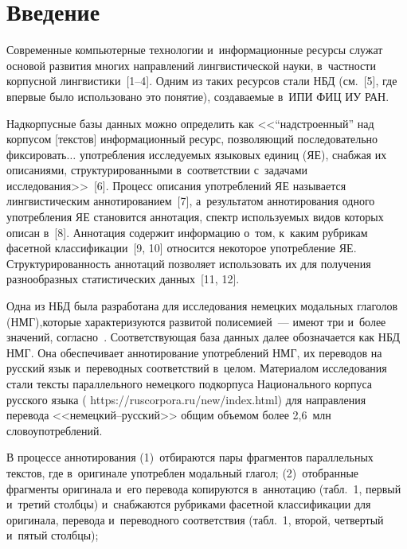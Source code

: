       
  
\vspace*{-3pt}


\thispagestyle{headings}

\begin{multicols}{2}

\label{st\stat}
      
\section{Введение}

     Современные компьютерные технологии и~информационные ресурсы 
служат основой развития многих направлений лингвистической науки, 
в~частности корпусной лингвистики~[1--4]. Одним из таких ресурсов стали 
НБД (см.~[5], где впервые было использовано это 
понятие), создаваемые в~ИПИ ФИЦ ИУ РАН.
     
Надкорпусные базы данных можно определить как <<``надстроенный'' над корпусом [текстов] 
информационный ресурс, позволяющий последовательно фиксировать$\ldots$ 
употребления исследуемых языковых единиц (ЯЕ), снабжая их описаниями, 
структурированными в~соответствии с~задачами исследования>>~[6]. Процесс 
описания употреблений ЯЕ называется лингвистическим аннотиро\-ванием~[7], 
а~результатом аннотирования одного употребления ЯЕ становится аннотация, 
спектр исполь\-зуемых видов которых описан в~[8]. Анно\-тация содержит 
информацию о~том, к~каким руб\-ри\-кам фасетной классификации~[9, 10] 
относится некоторое употребление ЯЕ. Структурированность аннотаций 
позволяет использовать их для получения разнообразных статистических 
данных~[11, 12].
     
     Одна из НБД была разработана для исследо\-вания немецких модальных 
глаголов (НМГ),\linebreak которые характеризуются развитой полисемией~--- имеют три 
и~более значений, согласно~\cite{13-gon}. Соответствующая база данных далее 
обозначается как НБД НМГ. Она обеспечивает аннотирование употреблений 
НМГ, их переводов на русский язык и~переводных соответствий в~целом. 
Материалом исследования стали тексты параллельного немецкого подкорпуса 
Национального корпуса русского языка ({\sf 
https://ruscorpora.ru/new/index.html}) для направления перевода <<не\-мец\-кий--рус\-ский>>
 общим объемом более 2,6~млн словоупотреблений.
     
     В процессе аннотирования (1)~отбираются пары фрагментов 
параллельных текстов, где в~оригинале употреблен модальный глагол; 
(2)~отобранные фрагменты оригинала и~его перевода копируются в~аннотацию 
(табл.~1, первый и~третий столбцы) и~снабжаются рубриками фасетной 
классификации для оригинала, перевода и~переводного соответствия 
(табл.~1, второй, четвертый и~пятый столбцы);\linebreak
\vspace*{-12pt}

\pagebreak

\end{multicols}

